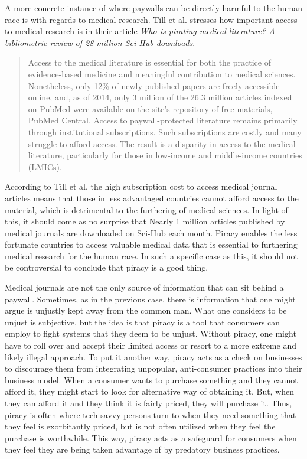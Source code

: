 \documentclass[onecolumn, 12pt]{article}
\begin{document}
A more concrete instance of where paywalls can be directly harmful to the human race is
with regards to medical research. Till et al. stresses how important access to medical
research is in their article \textit{Who is pirating medical literature? A bibliometric
review of 28 million Sci-Hub downloads}. \blockcquote{till:medical-literature} {Access to
the medical literature is essential for both the practice of evidence-based medicine and
meaningful contribution to medical sciences. Nonetheless, only 12\% of newly published
papers are freely accessible online, and, as of 2014, only 3 million of the 26.3 million
articles indexed on PubMed were available on the site's repository of free materials,
PubMed Central. Access to paywall-protected literature remains primarily through
institutional subscriptions. Such subscriptions are costly and many struggle to afford
access. The result is a disparity in access to the medical literature, particularly for
those in low-income and middle-income countries (LMICs).}
According to Till et al. the high subscription cost to access medical journal articles
means that those in less advantaged countries cannot afford access to the material, which
is detrimental to the furthering of medical sciences. In light of this, it should come as
no surprise that  {Nearly 1 million articles published
by medical journals are downloaded on Sci-Hub each month.} Piracy enables the less
fortunate countries to access valuable medical data that is essential to furthering
medical research for the human race. In such a specific case as this, it should not be
controversial to conclude that piracy is a good thing.

Medical journals are not the only source of information that can sit behind a paywall.
Sometimes, as in the previous case, there is information that one might argue is unjustly
kept away from the common man. What one considers to be unjust is subjective, but the idea
is that piracy is a tool that consumers can employ to fight systems that they deem to be
unjust. Without piracy, one might have to roll over and accept their limited access or
resort to a more extreme and likely illegal approach. To put it another way, piracy acts
as a check on businesses to discourage them from integrating unpopular, anti-consumer
practices into their business model. When a consumer wants to purchase something and they
cannot afford it, they might start to look for alternative way of obtaining it. But, when
they can afford it and they think it is fairly priced, they will purchase it. Thus, piracy
is often where tech-savvy persons turn to when they need something that they feel is
exorbitantly priced, but is not often utilized when they feel the purchase is worthwhile.
This way, piracy acts as a safeguard for consumers when they feel they are being taken
advantage of by predatory business practices.
\end{document}
